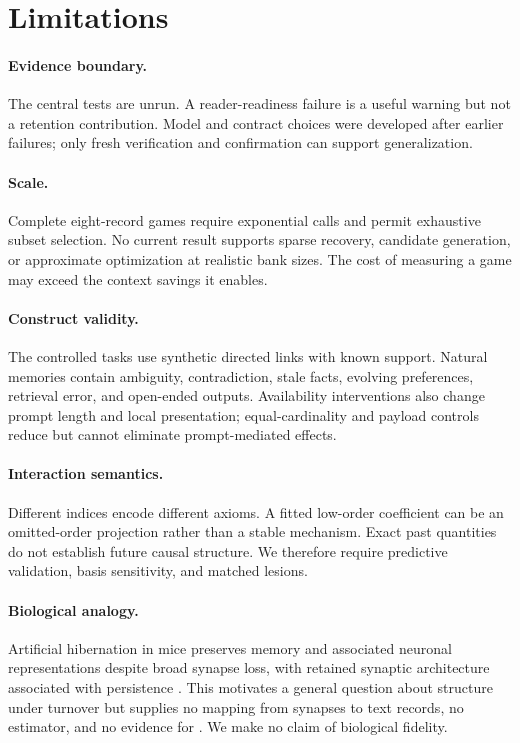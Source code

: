 \section{Limitations}
\label{sec:limitations}

\paragraph{Evidence boundary.}
The central tests are unrun. A reader-readiness failure is a useful warning but not
a retention contribution. Model and contract choices were developed after earlier
failures; only fresh verification and confirmation can support generalization.

\paragraph{Scale.}
Complete eight-record games require exponential calls and permit exhaustive subset
selection. No current result supports sparse recovery, candidate generation, or
approximate optimization at realistic bank sizes. The cost of measuring a game may
exceed the context savings it enables.

\paragraph{Construct validity.}
The controlled tasks use synthetic directed links with known support. Natural
memories contain ambiguity, contradiction, stale facts, evolving preferences,
retrieval error, and open-ended outputs. Availability interventions also change
prompt length and local presentation; equal-cardinality and payload controls reduce
but cannot eliminate prompt-mediated effects.

\paragraph{Interaction semantics.}
Different indices encode different axioms. A fitted low-order coefficient can be an
omitted-order projection rather than a stable mechanism. Exact past quantities do
not establish future causal structure. We therefore require predictive validation,
basis sensitivity, and matched lesions.

\paragraph{Biological analogy.}
Artificial hibernation in mice preserves memory and associated neuronal
representations despite broad synapse loss, with retained synaptic architecture
associated with persistence \citep{lin2026hibernation}. This motivates a general
question about structure under turnover but supplies no mapping from synapses to
text records, no estimator, and no evidence for \systemname{}. We make no claim of
biological fidelity.
